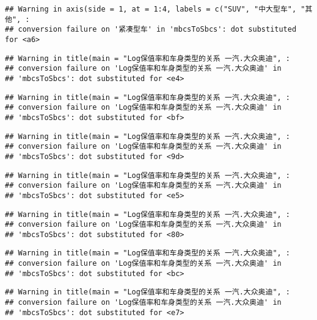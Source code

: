 \documentclass[]{article}
\begin{document}
\begin{verbatim}
## Warning in axis(side = 1, at = 1:4, labels = c("SUV", "中大型车", "其他", :
## conversion failure on '紧凑型车' in 'mbcsToSbcs': dot substituted for <a6>
\end{verbatim}

\begin{verbatim}
## Warning in title(main = "Log保值率和车身类型的关系 一汽.大众奥迪", :
## conversion failure on 'Log保值率和车身类型的关系 一汽.大众奥迪' in
## 'mbcsToSbcs': dot substituted for <e4>
\end{verbatim}

\begin{verbatim}
## Warning in title(main = "Log保值率和车身类型的关系 一汽.大众奥迪", :
## conversion failure on 'Log保值率和车身类型的关系 一汽.大众奥迪' in
## 'mbcsToSbcs': dot substituted for <bf>
\end{verbatim}

\begin{verbatim}
## Warning in title(main = "Log保值率和车身类型的关系 一汽.大众奥迪", :
## conversion failure on 'Log保值率和车身类型的关系 一汽.大众奥迪' in
## 'mbcsToSbcs': dot substituted for <9d>
\end{verbatim}

\begin{verbatim}
## Warning in title(main = "Log保值率和车身类型的关系 一汽.大众奥迪", :
## conversion failure on 'Log保值率和车身类型的关系 一汽.大众奥迪' in
## 'mbcsToSbcs': dot substituted for <e5>
\end{verbatim}

\begin{verbatim}
## Warning in title(main = "Log保值率和车身类型的关系 一汽.大众奥迪", :
## conversion failure on 'Log保值率和车身类型的关系 一汽.大众奥迪' in
## 'mbcsToSbcs': dot substituted for <80>
\end{verbatim}

\begin{verbatim}
## Warning in title(main = "Log保值率和车身类型的关系 一汽.大众奥迪", :
## conversion failure on 'Log保值率和车身类型的关系 一汽.大众奥迪' in
## 'mbcsToSbcs': dot substituted for <bc>
\end{verbatim}

\begin{verbatim}
## Warning in title(main = "Log保值率和车身类型的关系 一汽.大众奥迪", :
## conversion failure on 'Log保值率和车身类型的关系 一汽.大众奥迪' in
## 'mbcsToSbcs': dot substituted for <e7>
\end{verbatim}
\end{document}
